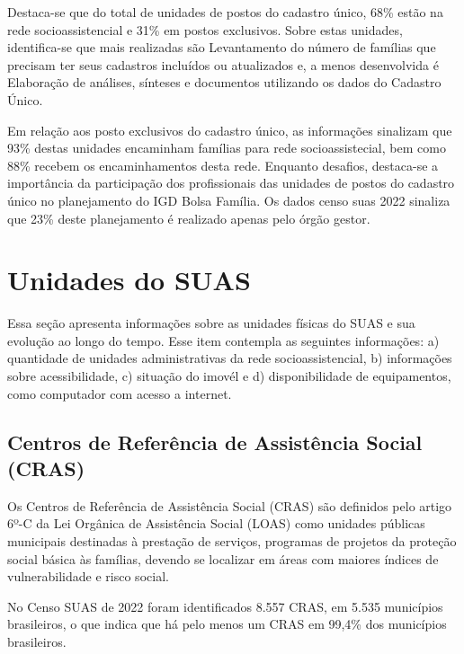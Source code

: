 \documentclass[
  brazilian]{report}
\begin{document}
Destaca-se que do total de unidades de postos do cadastro único, 68\%
estão na rede socioassistencial e 31\% em postos exclusivos. Sobre estas
unidades, identifica-se que mais realizadas são Levantamento do número
de famílias que precisam ter seus cadastros incluídos ou atualizados e,
a menos desenvolvida é Elaboração de análises, sínteses e documentos
utilizando os dados do Cadastro Único.

Em relação aos posto exclusivos do cadastro único, as informações
sinalizam que 93\% destas unidades encaminham famílias para rede
socioassistecial, bem como 88\% recebem os encaminhamentos desta rede.
Enquanto desafios, destaca-se a importância da participação dos
profissionais das unidades de postos do cadastro único no planejamento
do IGD Bolsa Família. Os dados censo suas 2022 sinaliza que 23\% deste
planejamento é realizado apenas pelo órgão gestor.

\hypertarget{unidades-do-suas}{%
\chapter{Unidades do SUAS}\label{unidades-do-suas}}

Essa seção apresenta informações sobre as unidades físicas do SUAS e sua
evolução ao longo do tempo. Esse item contempla as seguintes
informações: a) quantidade de unidades administrativas da rede
socioassistencial, b) informações sobre acessibilidade, c) situação do
imovél e d) disponibilidade de equipamentos, como computador com acesso
a internet.

\hypertarget{centros-de-referuxeancia-de-assistuxeancia-social-cras}{%
\section{Centros de Referência de Assistência Social
(CRAS)}\label{centros-de-referuxeancia-de-assistuxeancia-social-cras}}

Os Centros de Referência de Assistência Social (CRAS) são definidos pelo
artigo 6º-C da Lei Orgânica de Assistência Social (LOAS) como unidades
públicas municipais destinadas à prestação de serviços, programas de
projetos da proteção social básica às famílias, devendo se localizar em
áreas com maiores índices de vulnerabilidade e risco social.

No Censo SUAS de 2022 foram identificados 8.557 CRAS, em 5.535
municípios brasileiros, o que indica que há pelo menos um CRAS em 99,4\%
dos municípios brasileiros.
\end{document}
